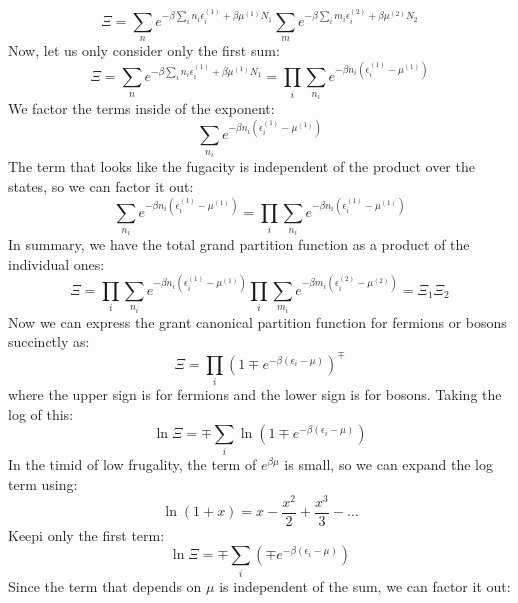 \documentclass[12pt]{article}
\begin{document}
\begin{equation}
  \Xi = \sum_{{n}} e^{-\beta \sum_{i} n_i \epsilon_i^{(1)} +  \beta \mu^{(1)} N_{1}} \sum_{{m}}e^{-\beta \sum_{i} m_i \epsilon_i^{(2)} +  \beta \mu^{(2)} N_{2}}
\end{equation}
Now, let us only consider only the first sum:
\begin{equation}
  \Xi = \sum_{{n}} e^{-\beta \sum_{i} n_i \epsilon_i^{(1)} +  \beta \mu^{(1)} N_{1}} = \prod_{i} \sum_{n_i} e^{-\beta n_i (\epsilon_i^{(1)} - \mu^{(1)})}
\end{equation}
We factor the terms inside of the exponent:
\begin{equation}
  \sum_{n_i} e^{-\beta n_i (\epsilon_i^{(1)} - \mu^{(1)})}
\end{equation}
The term that looks like the fugacity is independent of the product over the states, so we can factor it out:
\begin{equation}
  \sum_{n_i} e^{-\beta n_i (\epsilon_i^{(1)} - \mu^{(1)})} = \prod_{i} \sum_{n_i} e^{-\beta n_i (\epsilon_i^{(1)} - \mu^{(1)})}
\end{equation} 
In summary, we have the total grand partition function as a product of the individual ones:
\begin{equation}
  \Xi = \prod_{i} \sum_{n_i} e^{-\beta n_i (\epsilon_i^{(1)} - \mu^{(1)})} \prod_{i} \sum_{m_i} e^{-\beta m_i (\epsilon_i^{(2)} - \mu^{(2)})} = \Xi_1 \Xi_2
\end{equation}
Now we can express the grant canonical partition function for fermions or bosons succinctly as:
\begin{equation}
  \Xi = \prod_{i} \left( 1 \mp e^{-\beta(\epsilon_i - \mu)} \right)^{\mp}
\end{equation}
where the upper sign is for fermions and the lower sign is for bosons. Taking the log of this:
\begin{equation}
  \ln \Xi = \mp \sum_{i} \ln \left( 1 \mp e^{-\beta(\epsilon_i - \mu)} \right)
\end{equation}
In the timid of low frugality, the term of $e^{\beta \mu}$ is small, so we can expand the log term using:
\begin{equation}
  \ln(1+x) = x - \frac{x^2}{2} + \frac{x^3}{3} - \ldots
\end{equation}
Keepi only the first term:
\begin{equation}
  \ln \Xi = \mp \sum_{i} \left( \mp e^{-\beta(\epsilon_i - \mu)} \right)
\end{equation}
Since the term that depends on $\mu$ is independent of the sum, we can factor it out:
\end{document}

